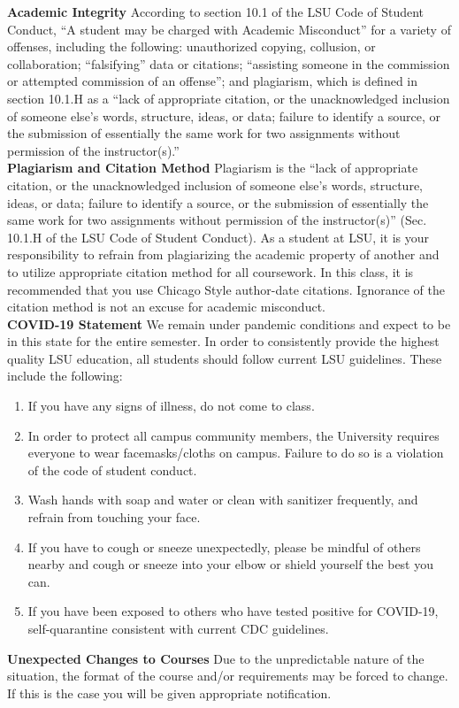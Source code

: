 \documentclass[11pt,article,oneside]{memoir}
\begin{document}
\noindent \textbf{Academic Integrity}
According to section 10.1 of the LSU Code of Student Conduct, ``A student may be charged with Academic Misconduct'' for a variety of offenses, including the following: unauthorized copying, collusion, or collaboration; ``falsifying'' data or citations; ``assisting someone in the commission or attempted commission of an offense''; and plagiarism, which is defined in section 10.1.H as a ``lack of appropriate citation, or the unacknowledged inclusion of someone else's words, structure, ideas, or data; failure to identify a source, or the submission of essentially the same work for two assignments without permission of the instructor(s).''\\

\noindent \textbf{Plagiarism and Citation Method}
Plagiarism is the ``lack of appropriate citation, or the unacknowledged inclusion of someone else's words, structure, ideas, or data; failure to identify a source, or the submission of essentially the same work for two assignments without permission of the instructor(s)'' (Sec. 10.1.H of the LSU Code of Student Conduct). As a student at LSU, it is your responsibility to refrain from plagiarizing the academic property of another and to utilize appropriate citation method for all coursework. In this class, it is recommended that you use Chicago Style author-date citations. Ignorance of the citation method is not an excuse for academic misconduct.\\

\noindent \textbf{COVID-19 Statement}
We remain under pandemic conditions and expect to be in this state for the entire semester. In
order to consistently provide the highest quality LSU education, all students should follow
current LSU guidelines. These include the following:
\begin{enumerate}
\item If you have any signs of illness, do not come to class.
\item In order to protect all campus community members, the University requires everyone to
wear facemasks/cloths on campus. Failure to do so is a violation of the code of student
conduct.
\item Wash hands with soap and water or clean with sanitizer frequently, and refrain from
touching your face.
\item If you have to cough or sneeze unexpectedly, please be mindful of others nearby and
cough or sneeze into your elbow or shield yourself the best you can.
\item If you have been exposed to others who have tested positive for COVID-19, self-quarantine consistent with current CDC guidelines.\\
\end{enumerate}

\noindent \textbf{Unexpected Changes to Courses}
Due to the unpredictable nature of the situation, the
format of the course and/or requirements may be forced to change.
If this is the case you will be given appropriate notification. \\
\end{document}
